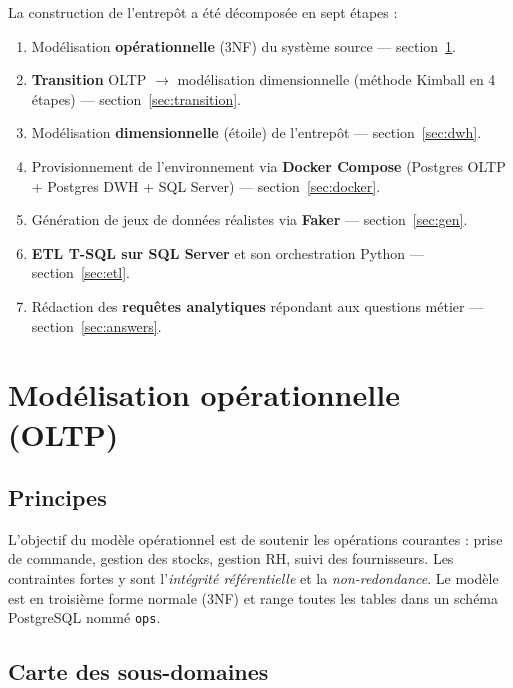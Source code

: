 \documentclass[11pt,a4paper]{article}
\newcommand{\code}[1]{\texttt{\small #1}}
\newcounter{question}
\begin{document}
La construction de l'entrepôt a été décomposée en sept étapes :
\begin{enumerate}
  \item Modélisation \textbf{opérationnelle} (3NF) du système source
        --- section~\ref{sec:oltp}.
  \item \textbf{Transition} OLTP $\to$ modélisation dimensionnelle (méthode
        Kimball en 4 étapes) --- section~\ref{sec:transition}.
  \item Modélisation \textbf{dimensionnelle} (étoile) de l'entrepôt
        --- section~\ref{sec:dwh}.
  \item Provisionnement de l'environnement via \textbf{Docker Compose}
        (Postgres OLTP + Postgres DWH + SQL Server)
        --- section~\ref{sec:docker}.
  \item Génération de jeux de données réalistes via \textbf{Faker}
        --- section~\ref{sec:gen}.
  \item \textbf{ETL T-SQL sur SQL Server} et son orchestration Python
        --- section~\ref{sec:etl}.
  \item Rédaction des \textbf{requêtes analytiques} répondant aux questions
        métier --- section~\ref{sec:answers}.
\end{enumerate}

\newpage
\section{Modélisation opérationnelle (OLTP)}
\label{sec:oltp}

\subsection{Principes}

L'objectif du modèle opérationnel est de soutenir les opérations courantes :
prise de commande, gestion des stocks, gestion RH, suivi des fournisseurs.
Les contraintes fortes y sont l'\emph{intégrité référentielle} et la
\emph{non-redondance}. Le modèle est en troisième forme normale (3NF) et
range toutes les tables dans un schéma PostgreSQL nommé \code{ops}.

\subsection{Carte des sous-domaines}
\end{document}
